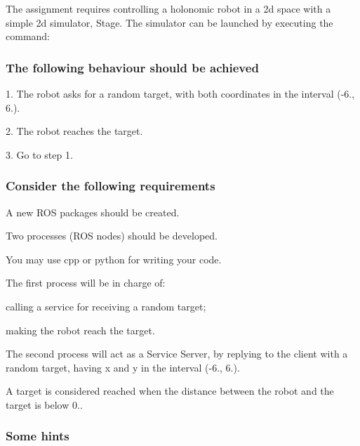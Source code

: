 The assignment requires controlling a holonomic robot in a 2d space with a simple 2d simulator, Stage. The simulator can be launched by executing the command\+:




\subsubsection*{The following behaviour should be achieved}


\begin{DoxyItemize}
\item 1. The robot asks for a random target, with both coordinates in the interval (-\/6., 6.).
\item 2. The robot reaches the target.
\item 3. Go to step 1.
\end{DoxyItemize}

\subsubsection*{Consider the following requirements}


\begin{DoxyItemize}
\item A new R\+OS packages should be created.
\item Two processes (R\+OS nodes) should be developed.
\item You may use cpp or python for writing your code.
\item The first process will be in charge of\+:
\begin{DoxyItemize}
\item calling a service for receiving a random target;
\item making the robot reach the target.
\end{DoxyItemize}
\item The second process will act as a Service Server, by replying to the client with a random target, having x and y in the interval (-\/6., 6.).
\item A target is considered reached when the distance between the robot and the target is below 0..
\end{DoxyItemize}

\subsubsection*{Some hints}


